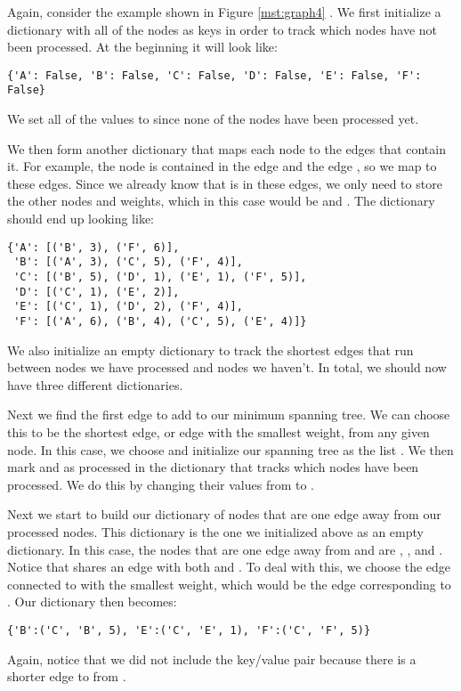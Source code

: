 Again, consider the example shown in Figure \ref{mst:graph4} .
We first initialize a dictionary with all of the nodes as keys in order to track which nodes have not been processed.
At the beginning it will look like:
\begin{lstlisting}
{'A': False, 'B': False, 'C': False, 'D': False, 'E': False, 'F': False}
\end{lstlisting}
We set all of the values to  since none of the nodes have been processed yet.

We then form another dictionary that maps each node to the edges that contain it. For example, the node  is contained in the edge  and the edge , so we map  to these edges. Since we already know that  is in these edges, we only need to store the other nodes and weights, which in this case would be  and .
The dictionary should end up looking like:
\begin{lstlisting}
{'A': [('B', 3), ('F', 6)],
 'B': [('A', 3), ('C', 5), ('F', 4)],
 'C': [('B', 5), ('D', 1), ('E', 1), ('F', 5)],
 'D': [('C', 1), ('E', 2)],
 'E': [('C', 1), ('D', 2), ('F', 4)],
 'F': [('A', 6), ('B', 4), ('C', 5), ('E', 4)]}
\end{lstlisting}
We also initialize an empty dictionary to track the shortest edges that run between nodes we have processed and nodes we haven't. In total, we should now have three different dictionaries.

Next we find the first edge to add to our minimum spanning tree. We can choose this to be the shortest edge, or edge with the smallest weight, from any given node. In this case, we choose  and initialize our spanning tree as the list \li{[('D', 'C', 1)]}.
We then mark  and  as processed in the dictionary that tracks which nodes have been processed. We do this by changing their values from  to .

Next we start to build our dictionary of nodes that are one edge away from our processed nodes. This dictionary is the one we initialized above as an empty dictionary. In this case, the nodes that are one edge away from  and  are , , and . Notice that  shares an edge with both  and . To deal with this, we choose the edge connected to  with the smallest weight, which would be the edge corresponding to . 
Our dictionary then becomes:
\begin{lstlisting}
{'B':('C', 'B', 5), 'E':('C', 'E', 1), 'F':('C', 'F', 5)}
\end{lstlisting}
Again, notice that we did not include the key/value pair  because there is a shorter edge to  from .

